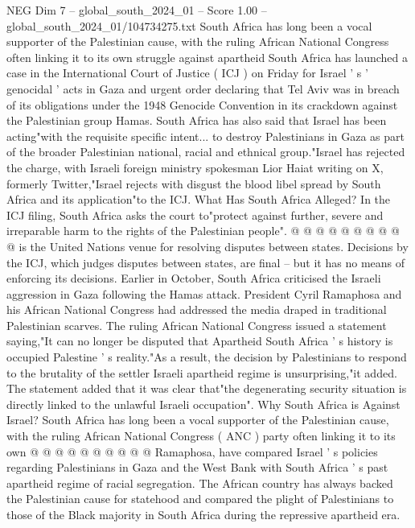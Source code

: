 \begin{textsample}{NEG Dim 7 – global\_south\_2024\_01 – Score 1.00 – global\_south\_2024\_01/104734275.txt}  \label{ex:f7_neg_147}
South Africa has long been a vocal supporter of the Palestinian cause, with the ruling African National Congress often linking it to its own struggle against apartheid South Africa has launched a case in the International Court of Justice ( ICJ ) on Friday for Israel ' s ' genocidal ' acts in Gaza and urgent order declaring that Tel Aviv was in breach of its obligations under the 1948 Genocide Convention in its crackdown against the Palestinian group Hamas.
South Africa has also said that Israel has been acting"with the requisite specific intent... to destroy Palestinians in Gaza as part of the broader Palestinian national, racial and ethnical group."Israel has rejected the charge, with Israeli foreign ministry spokesman Lior Haiat writing on X, formerly Twitter,"Israel rejects with disgust the blood libel spread by South Africa and its application"to the ICJ.
What Has South Africa Alleged?
In the ICJ filing, South Africa asks the court to"protect against further, severe and irreparable harm to the rights of the Palestinian people". @ @ @ @ @ @ @ @ @ @ is the United Nations venue for resolving disputes between states.
Decisions by the ICJ, which judges disputes between states, are final -- but it has no means of enforcing its decisions.
Earlier in October, South Africa criticised the Israeli aggression in Gaza following the Hamas attack.
President Cyril Ramaphosa and his African National Congress had addressed the media draped in traditional Palestinian scarves.
The ruling African National Congress issued a statement saying,"It can no longer be disputed that Apartheid South Africa ' s history is occupied Palestine ' s reality."As a result, the decision by Palestinians to respond to the brutality of the settler Israeli apartheid regime is unsurprising,"it added.
The statement added that it was clear that"the degenerating security situation is directly linked to the unlawful Israeli occupation".
Why South Africa is Against Israel?
South Africa has long been a vocal supporter of the Palestinian cause, with the ruling African National Congress ( ANC ) party often linking it to its own @ @ @ @ @ @ @ @ @ @ Ramaphosa, have compared Israel ' s policies regarding Palestinians in Gaza and the West Bank with South Africa ' s past apartheid regime of racial segregation.
The African country has always backed the Palestinian cause for statehood and compared the plight of Palestinians to those of the Black majority in South Africa during the repressive apartheid era.

\end{textsample}
